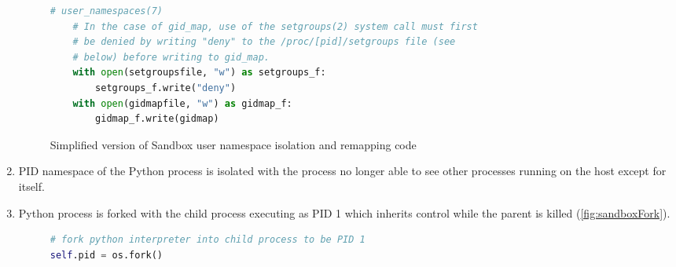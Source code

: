 \documentclass[hidelinks]{report}
\begin{document}
\begin{enumerate}
\begin{figure}[h]
\begin{lstlisting}[language=python, breaklines=true, linewidth=\linewidth, tabsize=4]
    # user_namespaces(7)
    # In the case of gid_map, use of the setgroups(2) system call must first
    # be denied by writing "deny" to the /proc/[pid]/setgroups file (see
    # below) before writing to gid_map.
    with open(setgroupsfile, "w") as setgroups_f:
        setgroups_f.write("deny")    
    with open(gidmapfile, "w") as gidmap_f:
        gidmap_f.write(gidmap)
		\end{lstlisting}
		\caption{Simplified version of Sandbox user namespace isolation and remapping code}
		\label{fig:sandboxUser}
	\end{figure}
	\item PID namespace of the Python process is isolated with the process no longer able to see other processes running on the host except for itself.
	\item Python process is forked with the child process executing as PID 1 which inherits control while the parent is killed (\autoref{fig:sandboxFork}).
	\begin{figure}[h]
		\centering
		\begin{lstlisting}[language=python, breaklines=true, linewidth=\linewidth, tabsize=4]
# fork python interpreter into child process to be PID 1
self.pid = os.fork()


\end{lstlisting}
\end{figure}
\end{enumerate}
\end{document}
